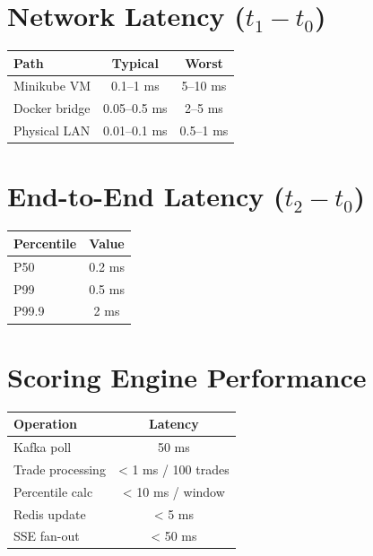 \documentclass[10pt,a4paper,oneside]{report}
\begin{document}
\section{Network Latency ($t_1 - t_0$)}

\begin{table}[H]\small
    \centering
    \begin{tabular}{lcc}
    \toprule
    \textbf{Path} & \textbf{Typical} & \textbf{Worst} \\
    \midrule
    Minikube VM & 0.1--1 ms & 5--10 ms \\
    Docker bridge & 0.05--0.5 ms & 2--5 ms \\
    Physical LAN & 0.01--0.1 ms & 0.5--1 ms \\
    \bottomrule
    \end{tabular}
\end{table}

\section{End-to-End Latency ($t_2 - t_0$)}

\begin{table}[H]\small
    \centering
    \begin{tabular}{lc}
    \toprule
    \textbf{Percentile} & \textbf{Value} \\
    \midrule
    P50 & 0.2 ms \\
    P99 & 0.5 ms \\
    P99.9 & 2 ms \\
    \bottomrule
    \end{tabular}
\end{table}

\section{Scoring Engine Performance}

\begin{table}[H]\small
    \centering
    \begin{tabular}{lc}
    \toprule
    \textbf{Operation} & \textbf{Latency} \\
    \midrule
    Kafka poll & 50 ms \\
    Trade processing & < 1 ms / 100 trades \\
    Percentile calc & < 10 ms / window \\
    Redis update & < 5 ms \\
    SSE fan-out & < 50 ms \\
    \bottomrule
    \end{tabular}
\end{table}
\end{document}
